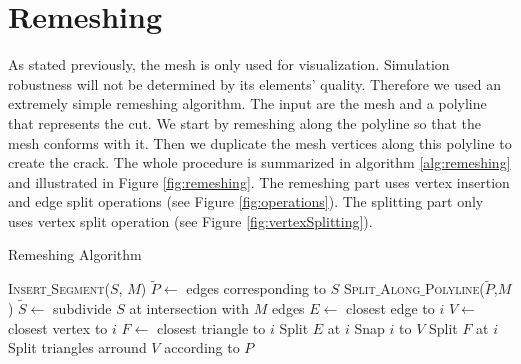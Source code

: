 \section{Remeshing} \label{appendix:remeshing}

As stated previously, the mesh is only used for visualization. Simulation robustness will not be determined by its elements' quality. Therefore we used an extremely simple remeshing algorithm. The input are the mesh and a polyline that represents the cut. We start by remeshing along the polyline so that the mesh  conforms with it. Then we duplicate the mesh vertices along this polyline to create the crack. The whole procedure is summarized in algorithm \ref{alg:remeshing} and illustrated in Figure \ref{fig:remeshing}. The remeshing part uses vertex insertion and edge split operations (see Figure \ref{fig:operations}). The splitting part only uses vertex split operation (see Figure \ref{fig:vertexSplitting}).

\begin{algorithm}[hp]
\caption[Frame-based cutting: Remeshing algorithm]{\label{alg:remeshing}Remeshing Algorithm}
\begin{algorithmic}[1]
\State \textsc{Insert$\_$Segment}($S$, $M$)
\State $\tilde{P} \gets$ edges corresponding to $S$
\State \textsc{Split$\_$Along$\_$Polyline}($\tilde{P}$,$M$)
\EndProcedure
\State
{}
\State $\tilde{S} \gets$ subdivide $S$ at intersection with $M$ edges
\State $E \gets$ closest edge to $i$
\State $V \gets$ closest vertex to $i$
\State $F \gets$ closest triangle to $i$
\State Split $E$ at $i$
\State Snap $i$ to $V$
\Else
\State Split $F$ at $i$
\EndIf
\EndFor
\EndProcedure
\State
{}
\State Split triangles arround $V$ according to $P$
\EndFor
\EndProcedure
\end{algorithmic}
\end{algorithm}

